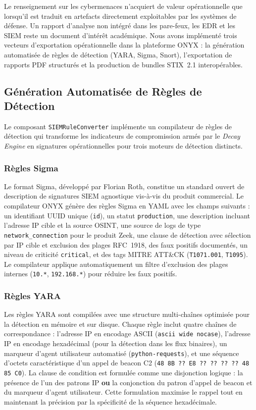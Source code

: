 Le renseignement sur les cybermenaces n'acquiert de valeur opérationnelle que lorsqu'il est traduit en artefacts directement exploitables par les systèmes de défense. Un rapport d'analyse non intégré dans les pare-feux, les EDR et les SIEM reste un document d'intérêt académique. Nous avons implémenté trois vecteurs d'exportation opérationnelle dans la plateforme ONYX : la génération automatisée de règles de détection (YARA, Sigma, Snort), l'exportation de rapports PDF structurés et la production de bundles STIX~2.1 interopérables.

\subsection{Génération Automatisée de Règles de Détection}

Le composant \texttt{SIEMRuleConverter} implémente un compilateur de règles de détection qui transforme les indicateurs de compromission armés par le \textit{Decay Engine} en signatures opérationnelles pour trois moteurs de détection distincts.

\subsubsection{Règles Sigma}

Le format Sigma, développé par Florian Roth, constitue un standard ouvert de description de signatures SIEM agnostique vis-à-vis du produit commercial. Le compilateur ONYX génère des règles Sigma en YAML avec les champs suivants : un identifiant UUID unique (\texttt{id}), un statut \texttt{production}, une description incluant l'adresse IP cible et la source OSINT, une source de logs de type \texttt{network\_connection} pour le produit Zeek, une clause de détection avec sélection par IP cible et exclusion des plages RFC~1918, des faux positifs documentés, un niveau de criticité \texttt{critical}, et des tags MITRE ATT\&CK (\texttt{T1071.001}, \texttt{T1095}). Le compilateur applique automatiquement un filtre d'exclusion des plages internes (\texttt{10.*}, \texttt{192.168.*}) pour réduire les faux positifs.

\subsubsection{Règles YARA}

Les règles YARA sont compilées avec une structure multi-chaînes optimisée pour la détection en mémoire et sur disque. Chaque règle inclut quatre chaînes de correspondance : l'adresse IP en encodage ASCII (\texttt{ascii wide nocase}), l'adresse IP en encodage hexadécimal (pour la détection dans les flux binaires), un marqueur d'agent utilisateur automatisé (\texttt{python-requests}), et une séquence d'octets caractéristique d'un appel de beacon C2 (\texttt{48 8B ?? E8 ?? ?? ?? ?? 48 85 C0}). La clause de condition est formulée comme une disjonction logique : la présence de l'un des patrons IP \textbf{ou} la conjonction du patron d'appel de beacon et du marqueur d'agent utilisateur. Cette formulation maximise le rappel tout en maintenant la précision par la spécificité de la séquence hexadécimale.

